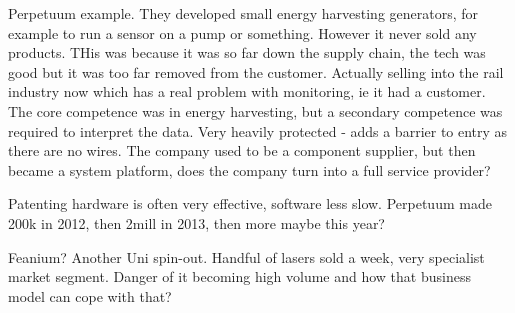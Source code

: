 Perpetuum example. They developed small energy harvesting generators, for example to run a sensor on a pump or something. However it never sold any products. THis was because it was so far down the supply chain, the tech was good but it was too far removed from the customer. Actually selling into the rail industry now which has a real problem with monitoring, ie it had a customer. The core competence was in energy harvesting, but a secondary competence was required to interpret the data. Very heavily protected - adds a barrier to entry as there are no wires. The company used to be a component supplier, but then became a system platform, does the company turn into a full service provider? 

Patenting hardware is often very effective, software less slow. Perpetuum made 200k in 2012, then 2mill in 2013, then more maybe this year?

Feanium? Another Uni spin-out. Handful of lasers sold a week, very specialist market segment. Danger of it becoming high volume and how that business model can cope with that?



\lipsum[3] 


